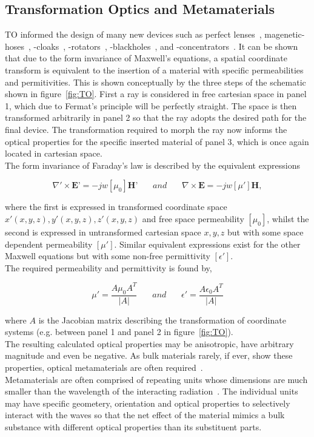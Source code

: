 \documentclass[11pt]{iopart}
\begin{document}
\subsection{Transformation Optics and Metamaterials}
TO informed the design of many new devices such as perfect
lenses~\cite{}, magenetic-hoses~\cite{}, -cloaks~\cite{},
-rotators~\cite{}, -blackholes~\cite{}, and -concentrators~\cite{}. It
can be shown that due to the form invariance of Maxwell's equations, a
spatial coordinate transform is equivalent to the insertion of a
material with specific permeabilities and permitivities. This is shown
conceptually by the three steps of the schematic shown in
figure~\ref{fig:TO}. First a ray is considered in free cartesian space
in panel 1, which due to Fermat's principle will be perfectly
straight. The space is then transformed arbitrarily in panel 2 so that
the ray adopts the desired path for the final device. The
transformation required to morph the ray now informs the optical
properties for the specific inserted material of panel 3, which is
once again located in cartesian space.\\
The form invariance of Faraday's law is described by the equivalent
expressions

\begin{equation}
  \label{ME1}
  \nabla'\times \textbf{E'} = -jw[\mu_0]\textbf{H'}
  ~~~~~~~~and~~~~~~~~
  \nabla\times \textbf{E} = -jw[\mu']\textbf{H},
\end{equation}

where the first is expressed in transformed coordinate space $x'(x, y,
z), y'(x, y, z), z'(x, y, z)$ and free space permeability $[\mu_0]$,
whilst the second is expressed in untransformed cartesian space $x, y,
z$ but with some space dependent permeability $[\mu']$. Similar
equivalent expressions exist for the other Maxwell equations but with
some non-free permittivity $[\epsilon']$.\\
The required permeability and permittivity is found by,

\begin{equation}
  \label{eqn:J}
  \mu'=\frac{A\mu_0 A^T}{|A|}
  ~~~~~~~~and~~~~~~~~
  \epsilon'=\frac{A\epsilon_0 A^T}{|A|}
\end{equation}

where $A$ is the Jacobian matrix describing the transformation of
coordinate systems (e.g. between panel 1 and panel 2 in
figure~\ref{fig:TO}). \\
The resulting calculated optical properties may be anisotropic, have
arbitrary magnitude and even be negative. As bulk materials rarely, if
ever, show these properties, optical metamaterials are often
required~\cite{META3}. \\
Metamaterials are often comprised of repeating units whose dimensions
are much smaller than the wavelength of the interacting
radiation~\cite{META2}. The individual units may have specific
geometery, orientation and optical properties to selectively interact
with the waves so that the net effect of the material mimics a bulk
substance with different optical properties than its substituent
parts.\\
\end{document}
